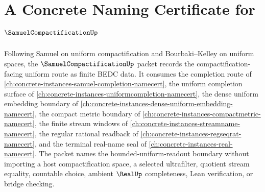 \chapter{A Concrete Naming Certificate for $\SamuelCompactificationUp$}
\label{ch:concrete-instances-samuel-compactification-namecert}

Following Samuel on uniform compactification and Bourbaki--Kelley on uniform spaces, the $\SamuelCompactificationUp$ packet records the compactification-facing uniform route as finite BEDC data. It consumes the completion route of \autoref{ch:concrete-instances-samuel-completion-namecert}, the uniform completion surface of \autoref{ch:concrete-instances-uniformcompletion-namecert}, the dense uniform embedding boundary of \autoref{ch:concrete-instances-dense-uniform-embedding-namecert}, the compact metric boundary of \autoref{ch:concrete-instances-compactmetric-namecert}, the finite stream windows of \autoref{ch:concrete-instances-streamname-namecert}, the regular rational readback of \autoref{ch:concrete-instances-regseqrat-namecert}, and the terminal real-name seal of \autoref{ch:concrete-instances-real-namecert}. The packet names the bounded-uniform-readout boundary without importing a host compactification space, a selected ultrafilter, quotient stream equality, countable choice, ambient $\RealUp$ completeness, Lean verification, or bridge checking.

